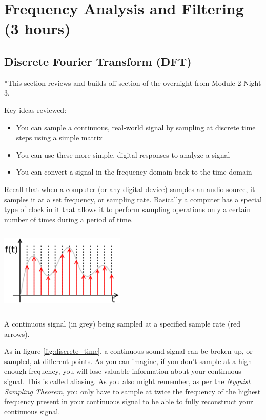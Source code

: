 \documentclass{tufte-handout}
\begin{document}
\section{Frequency Analysis and Filtering (3 hours)}

\subsection{Discrete Fourier Transform (DFT)}
*This section reviews and builds off section of the overnight from Module 2 Night 3.

Key ideas reviewed:
\begin{itemize}
	\item You can sample a continuous, real-world signal by sampling at discrete time steps using a simple matrix
	\item You can use these more simple, digital responses to analyze a signal
	\item You can convert a signal in the frequency domain back to the time domain
\end{itemize}

Recall that when a computer (or any digital device) samples an audio source, it samples it at a set frequency, or sampling rate. Basically a computer has a special type of clock in it that allows it to perform sampling operations only a certain number of times during a period of time. 
 
 \begin{marginfigure}
    \centering
    \includegraphics[width = 6cm, height = 4cm]{discrete_time.png}
    \label{fig:discrete_time}
\caption{A continuous signal (in grey) being sampled at a specified sample rate (red arrows).}
\end{marginfigure}

As in figure \ref{fig:discrete_time}, a continuous sound signal can be broken up, or sampled, at different points. As you can imagine, if you don't sample at a high enough frequency, you will lose valuable information about your continuous signal. This is called aliasing. As you also might remember, as per the \textit{Nyquist Sampling Theorem}, you only have to sample at twice the frequency of the highest frequency present in your continuous signal to be able to fully reconstruct your continuous signal. 
\end{document}
